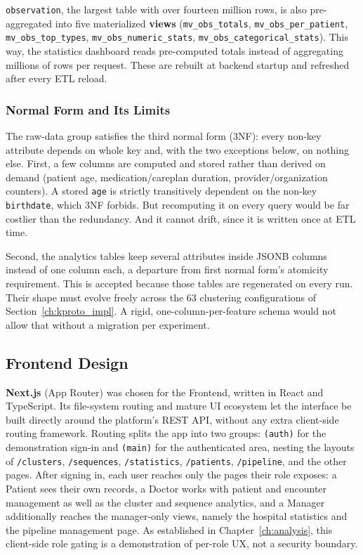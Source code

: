 \texttt{observation}, the largest table with over fourteen million rows, is also pre-aggregated into five materialized \textbf{views} (\texttt{mv\_obs\_totals}, \texttt{mv\_obs\_per\_patient}, \texttt{mv\_obs\_top\_types}, \texttt{mv\_obs\_numeric\_stats}, \texttt{mv\_obs\_categorical\_stats}). This way, the statistics dashboard reads pre-computed totals instead of aggregating millions of rows per request. These are rebuilt at backend startup and refreshed after every ETL reload.

\subsubsection*{Normal Form and Its Limits}

The raw-data group satisfies the third normal form (3NF): every non-key attribute depends on whole key and, with the two exceptions below, on nothing else. First, a few columns are computed and stored rather than derived on demand (patient age, medication/careplan duration, provider/organization counters). A stored \texttt{age} is strictly transitively dependent on the non-key \texttt{birthdate}, which 3NF forbids. But recomputing it on every query would be far costlier than the redundancy. And it cannot drift, since it is written once at ETL time.

Second, the analytics tables keep several attributes inside JSONB columns instead of one column each, a departure from first normal form's atomicity requirement. This is accepted because those tables are regenerated on every run. Their shape must evolve freely across the 63 clustering configurations of Section~\ref{ch:kproto_impl}. A rigid, one-column-per-feature schema would not allow that without a migration per experiment.

\subsection{Frontend Design}
\label{ch:frontend_design}

\textbf{Next.js} (App Router) was chosen for the Frontend, written in React and TypeScript. Its file-system routing and mature UI ecosystem let the interface be built directly around the platform's REST API, without any extra client-side routing framework. Routing splits the app into two groups: \texttt{(auth)} for the demonstration sign-in and \texttt{(main)} for the authenticated area, nesting the layouts of \texttt{/clusters}, \texttt{/sequences}, \texttt{/statistics}, \texttt{/patients}, \texttt{/pipeline}, and the other pages. After signing in, each user reaches only the pages their role exposes: a Patient sees their own records, a Doctor works with patient and encounter management as well as the cluster and sequence analytics, and a Manager additionally reaches the manager-only views, namely the hospital statistics and the pipeline management page. As established in Chapter~\ref{ch:analysis}, this client-side role gating is a demonstration of per-role UX, not a security boundary.

